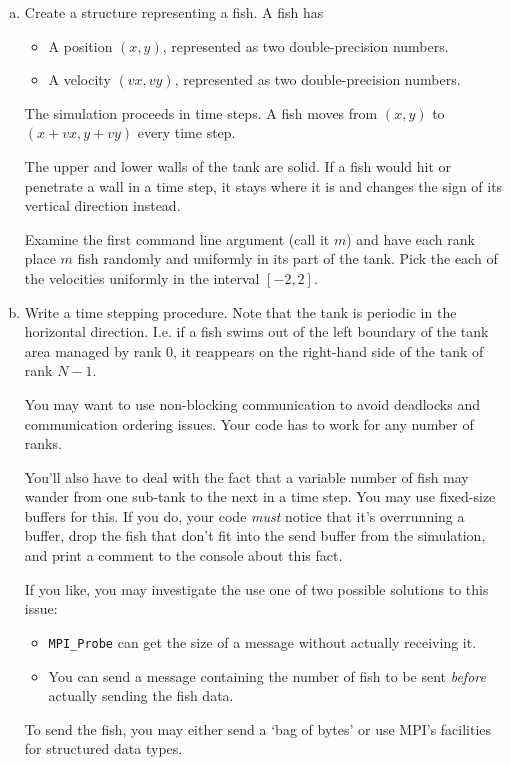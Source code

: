 \documentclass[11pt]{article}
\begin{document}
\begin{enumerate}[a)]
  \item Create a structure representing a fish. A fish has
    \begin{itemize}
      \item A position $(x,y)$, represented as two double-precision
        numbers.
      \item A velocity $(vx,vy)$, represented as two double-precision
        numbers.
    \end{itemize}
    The simulation proceeds in time steps. A fish moves from $(x,y)$
    to $(x+vx, y+vy)$ every time step.

    The upper and lower walls of the tank are solid. If a fish would
    hit or penetrate a wall in a time step, it stays where it is and
    changes the sign of its vertical direction instead.

    Examine the first command line argument (call it $m$) and have
    each rank place $m$ fish randomly and uniformly in its part of the
    tank. Pick the each of the velocities uniformly in the interval
    $[-2,2]$.

  \item Write a time stepping procedure. Note that the tank is
    periodic in the horizontal direction. I.e. if a fish swims out of
    the left boundary of the tank area managed by rank $0$, it
    reappears on the right-hand side of the tank of rank $N-1$.

    You may want to use non-blocking communication to avoid deadlocks
    and communication ordering issues. Your code has to work for any
    number of ranks.

    You'll also have to deal with the fact that a variable number of
    fish may wander from one sub-tank to the next in a time step.
    You may use fixed-size buffers for this. If you do, your code
    \emph{must} notice that it's overrunning a buffer, drop the fish
    that don't fit into the send buffer from the simulation, and print
    a comment to the console about this fact.

    If you like, you may investigate the use one of two possible
    solutions to this issue:
    \begin{itemize}
      \item \texttt{MPI\_Probe} can get the size of a message without
        actually receiving it.
      \item You can send a message containing the number of fish to be
        sent \emph{before} actually sending the fish data.
    \end{itemize}
    To send the fish, you may either send a `bag of bytes' or use
    MPI's facilities for structured data types.


\end{enumerate}
\end{document}
